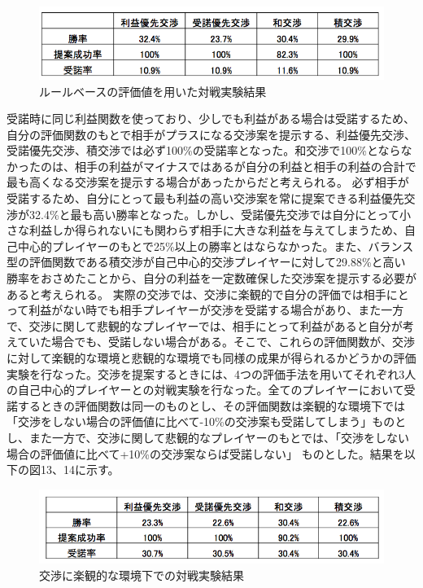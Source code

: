 \documentclass[a4, 10pt,dvipdfmx]{jsarticle}
\begin{document}
\begin{figure}[b]
    \begin{center}
      \includegraphics[width=120mm]{img/baseline.png}
    \end{center}
    \caption{ルールベースの評価値を用いた対戦実験結果}
    \label{rulebase_value}
\end{figure}


受諾時に同じ利益関数を使っており、少しでも利益がある場合は受諾するため、自分の評価関数のもとで相手がプラスになる交渉案を提示する、利益優先交渉、受諾優先交渉、積交渉では必ず100\%の受諾率となった。和交渉で100\%とならなかったのは、相手の利益がマイナスではあるが自分の利益と相手の利益の合計で最も高くなる交渉案を提示する場合があったからだと考えられる。
必ず相手が受諾するため、自分にとって最も利益の高い交渉案を常に提案できる利益優先交渉が32.4\%と最も高い勝率となった。しかし、受諾優先交渉では自分にとって小さな利益しか得られないにも関わらず相手に大きな利益を与えてしまうため、自己中心的プレイヤーのもとで25\%以上の勝率とはならなかった。また、バランス型の評価関数である積交渉が自己中心的交渉プレイヤーに対して29.88\%と高い勝率をおさめたことから、自分の利益を一定数確保した交渉案を提示する必要があると考えられる。
実際の交渉では、交渉に楽観的で自分の評価では相手にとって利益がない時でも相手プレイヤーが交渉を受諾する場合があり、また一方で、交渉に関して悲観的なプレイヤーでは、相手にとって利益があると自分が考えていた場合でも、受諾しない場合がある。そこで、これらの評価関数が、交渉に対して楽観的な環境と悲観的な環境でも同様の成果が得られるかどうかの評価実験を行なった。交渉を提案するときには、4つの評価手法を用いてそれぞれ3人の自己中心的プレイヤーとの対戦実験を行なった。全てのプレイヤーにおいて受諾するときの評価関数は同一のものとし、その評価関数は楽観的な環境下では「交渉をしない場合の評価値に比べて-10\%の交渉案も受諾してしまう」ものとし、また一方で、交渉に関して悲観的なプレイヤーのもとでは、「交渉をしない場合の評価値に比べて+10\%の交渉案ならば受諾しない」
ものとした。結果を以下の図13、14に示す。   

\begin{figure}[b]
    \begin{center}
      \includegraphics[width=120mm]{img/nego_positive.png}
    \end{center}
    \caption{交渉に楽観的な環境下での対戦実験結果}
    \label{envirn_positive}
\end{figure}
\end{document}
